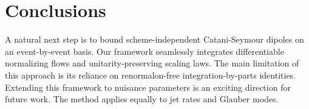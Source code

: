 \section{Conclusions}\label{sec:conclusions}

A natural next step is to bound scheme-independent Catani-Seymour
dipoles on an event-by-event basis. Our framework seamlessly integrates
differentiable normalizing flows and unitarity-preserving scaling laws.
The main limitation of this approach is its reliance on renormalon-free
integration-by-parts identities. Extending this framework to nuisance
parameters is an exciting direction for future work. The method applies
equally to jet rates and Glauber modes.

